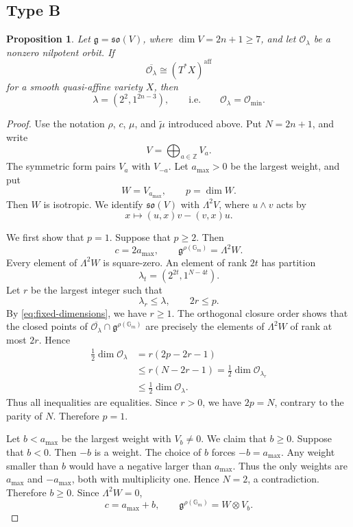 \documentclass[12pt]{article}
\newtheorem{proposition}[theorem]{Proposition}
\theoremstyle{remark}
\theoremstyle{plain}
\newcommand{\Gm}{\mathbb G_m}
\newcommand{\aff}{\mathrm{aff}}
\begin{document}
\subsection{Type B}\label{sec:typeB}

\begin{proposition}\label{prop:typeB}
Let $\mathfrak g=\mathfrak{so}(V)$, where $\dim V=2n+1\geq7$, and
let $\mathcal O_\lambda$ be a nonzero nilpotent orbit. If
\[
\overline{\mathcal O_\lambda}\cong(T^*X)^{\aff}
\]
for a smooth quasi-affine variety $X$, then
\[
\lambda=(2^2,1^{2n-3}),
\qquad\text{i.e.}\qquad
\mathcal O_\lambda=\mathcal O_{\min}.
\]
\end{proposition}

\begin{proof}
Use the notation $\rho$, $c$, $\mu$, and $\widetilde{\mu}$ introduced
above. Put $N=2n+1$, and write
\[
V=\bigoplus_{a\in\mathbb Z}V_a.
\]
The symmetric form pairs $V_a$ with $V_{-a}$. Let $a_{\max}>0$ be the
largest weight, and put
\[
W=V_{a_{\max}},\qquad p=\dim W.
\]
Then $W$ is isotropic. We identify $\mathfrak{so}(V)$ with
$\Lambda^2V$, where $u\wedge v$ acts by
\[
x\longmapsto (u,x)v-(v,x)u.
\]

We first show that $p=1$. Suppose that $p\geq2$. Then
\[
c=2a_{\max},
\qquad
\mathfrak g^{\rho(\Gm)}=\Lambda^2W.
\]
Every element of $\Lambda^2W$ is square-zero. An element of rank $2t$
has partition
\[
\lambda_t=(2^{2t},1^{N-4t}).
\]
Let $r$ be the largest integer such that
\[
\lambda_r\leq\lambda,
\qquad
2r\leq p.
\]
By \eqref{eq:fixed-dimensions}, we have $r\geq1$. The orthogonal
closure order \cite{KP} shows that the closed points of
$\overline{\mathcal O_\lambda}\cap\mathfrak g^{\rho(\Gm)}$
are precisely the elements of $\Lambda^2W$ of rank at most $2r$.
Hence
\[
\begin{aligned}
\frac12\dim\mathcal O_\lambda
&=r(2p-2r-1)\\
&\leq r(N-2r-1)
=\frac12\dim\mathcal O_{\lambda_r}\\
&\leq\frac12\dim\mathcal O_\lambda.
\end{aligned}
\]
Thus all inequalities are equalities. Since $r>0$, we have $2p=N$,
contrary to the parity of $N$. Therefore $p=1$.

Let $b<a_{\max}$ be the largest weight with $V_b\ne0$. We claim that
$b\geq0$. Suppose that $b<0$. Then $-b$ is a weight. The choice of
$b$ forces $-b=a_{\max}$. Any weight smaller than $b$ would have a
negative larger than $a_{\max}$. Thus the only weights are
$a_{\max}$ and $-a_{\max}$, both with multiplicity one. Hence $N=2$,
a contradiction. Therefore $b\geq0$. Since $\Lambda^2W=0$,
\[
c=a_{\max}+b,
\qquad
\mathfrak g^{\rho(\Gm)}=W\otimes V_b.
\]


\end{proof}
\end{document}
